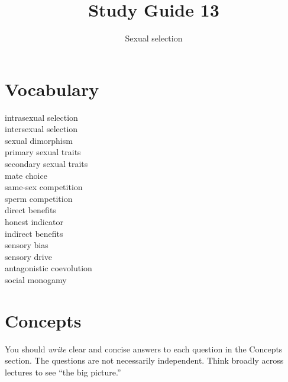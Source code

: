 \documentclass[letterpaper]{tufte-handout}
\title{Study Guide 13\hfill}
\author{Sexual selection}
\date{} %
\begin{document}
\maketitle	%

\section{Vocabulary}

\begin{multicols}{2}
intrasexual selection\\
intersexual selection\\
sexual dimorphism\\
primary sexual traits\\
secondary sexual traits \\
mate choice\\
same-sex competition\\
sperm competition\\
direct benefits \\
honest indicator \\
indirect benefits \\
sensory bias\\
sensory drive\\
antagonistic coevolution\\
social monogamy
\end{multicols}


\section{Concepts}

You should \emph{write} clear and concise answers to each question in the Concepts section.  The questions are not necessarily independent.  Think broadly across lectures to see ``the big picture.'' 
\end{document}
